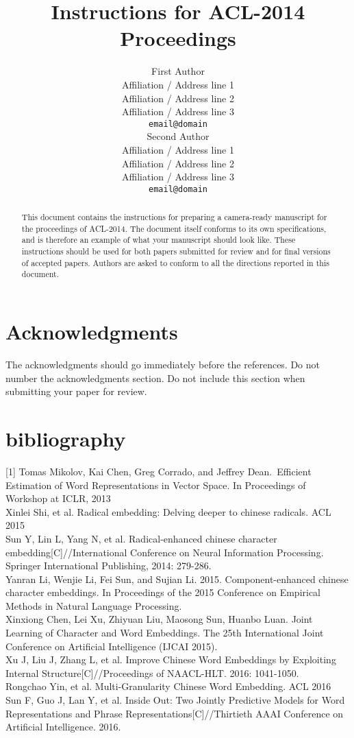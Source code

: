 \documentclass[11pt]{article}
\title{Instructions for ACL-2014 Proceedings}
\author{First Author \\
  Affiliation / Address line 1 \\
  Affiliation / Address line 2 \\
  Affiliation / Address line 3 \\
  {\tt email@domain} \\\And
  Second Author \\
  Affiliation / Address line 1 \\
  Affiliation / Address line 2 \\
  Affiliation / Address line 3 \\
  {\tt email@domain} \\}
\date{}
\begin{document}
\maketitle
\begin{abstract}
  This document contains the instructions for preparing a camera-ready
  manuscript for the proceedings of ACL-2014. The document itself
  conforms to its own specifications, and is therefore an example of
  what your manuscript should look like. These instructions should be
  used for both papers submitted for review and for final versions of
  accepted papers.  Authors are asked to conform to all the directions
  reported in this document.
\end{abstract}







\section*{Acknowledgments}

The acknowledgments should go immediately before the references.  Do
not number the acknowledgments section. Do not include this section
when submitting your paper for review.

%
%

\section{bibliography}

[1] Tomas Mikolov, Kai Chen, Greg Corrado, and Jeffrey Dean. Efficient Estimation of Word Representations in Vector Space. In Proceedings of Workshop at ICLR, 2013\\
[2] Xinlei Shi, et al. Radical embedding: Delving deeper to chinese radicals. ACL 2015\\
[3] Sun Y, Lin L, Yang N, et al. Radical-enhanced chinese character embedding[C]//International Conference on Neural Information Processing. Springer International Publishing, 2014: 279-286.\\
[4] Yanran Li, Wenjie Li, Fei Sun, and Sujian Li. 2015. Component-enhanced chinese character embeddings. In Proceedings of the 2015 Conference on Empirical Methods in Natural Language Processing.\\
[5] Xinxiong Chen, Lei Xu, Zhiyuan Liu, Maosong Sun, Huanbo Luan. Joint Learning of Character and Word Embeddings. The 25th International Joint Conference on Artificial Intelligence (IJCAI 2015).\\
[6] Xu J, Liu J, Zhang L, et al.  Improve Chinese Word Embeddings by Exploiting Internal Structure[C]//Proceedings of NAACL-HLT. 2016: 1041-1050.\\
[7] Rongchao Yin, et al.  Multi-Granularity Chinese Word Embedding. ACL 2016\\
[8] Sun F, Guo J, Lan Y, et al. Inside Out: Two Jointly Predictive Models for Word Representations and Phrase Representations[C]//Thirtieth AAAI Conference on Artificial Intelligence. 2016.\\
\end{document}
